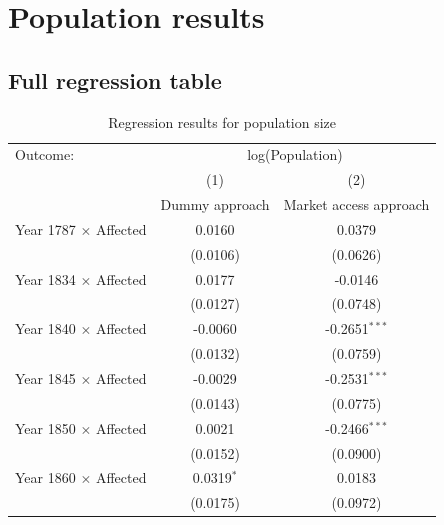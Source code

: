 \FloatBarrier

\section{Population results}

\subsection{Full regression table} 
\FloatBarrier
\begin{table}[H]
\centering
\caption{Regression results for population size} \label{tab:pop1}
\footnotesize
\begin{tabular}{lcc}
   \tabularnewline \midrule \midrule
   Outcome: & \multicolumn{2}{c}{log(Population)}\\
                                                    & (1)             & (2)\\  
                                                    & Dummy approach  & Market access approach\\  
   \midrule
   Year 1787 $\times$ Affected                       & 0.0160          & 0.0379\\   
                                                     & (0.0106)        & (0.0626)\\   
   Year 1834 $\times$ Affected                       & 0.0177          & -0.0146\\   
                                                     & (0.0127)        & (0.0748)\\   
   Year 1840 $\times$ Affected                       & -0.0060         & -0.2651$^{***}$\\   
                                                     & (0.0132)        & (0.0759)\\   
   Year 1845 $\times$ Affected                       & -0.0029         & -0.2531$^{***}$\\   
                                                     & (0.0143)        & (0.0775)\\   
   Year 1850 $\times$ Affected                       & 0.0021          & -0.2466$^{***}$\\   
                                                     & (0.0152)        & (0.0900)\\   
   Year 1860 $\times$ Affected                       & 0.0319$^{*}$    & 0.0183\\   
                                                     & (0.0175)        & (0.0972)\\   

\end{tabular}
\end{table}
